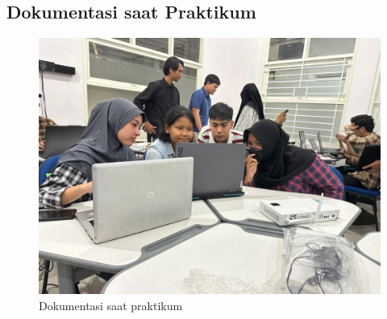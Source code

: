 \subsection{Dokumentasi saat Praktikum}
\begin{figure}[H]
	\centering
	\includegraphics[width=0.75\linewidth]{P2/img/dokum1.jpg}
	\caption{Dokumentasi saat praktikum}
	\label{fig:gambar32}
\end{figure}